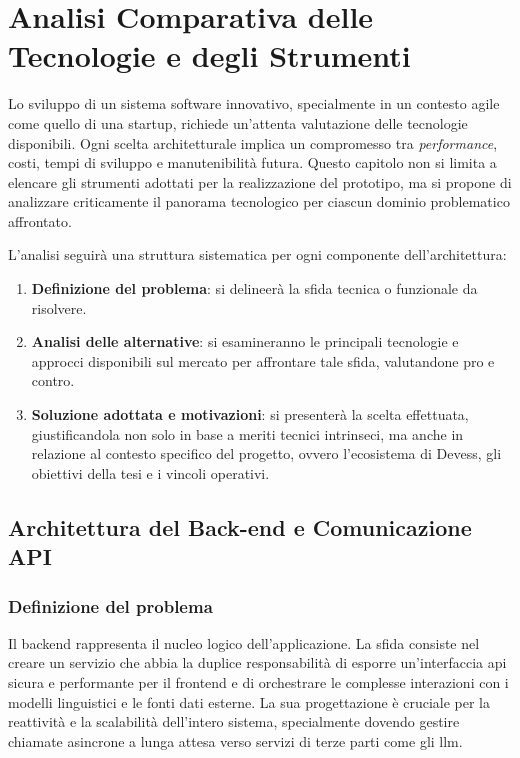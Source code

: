 \chapter{Analisi Comparativa delle Tecnologie e degli Strumenti}
\label{ch:tecnologie_strumenti}

Lo sviluppo di un sistema software innovativo, specialmente in un contesto \gls{agile} come quello di una startup, richiede un'attenta valutazione delle tecnologie disponibili. Ogni scelta architetturale implica un compromesso tra \textit{performance}, costi, tempi di sviluppo e manutenibilità futura. Questo capitolo non si limita a elencare gli strumenti adottati per la realizzazione del prototipo, ma si propone di analizzare criticamente il panorama tecnologico per ciascun dominio problematico affrontato.

L'analisi seguirà una struttura sistematica per ogni componente dell'architettura:
\begin{enumerate}
    \item \textbf{Definizione del problema}: si delineerà la sfida tecnica o funzionale da risolvere.
    \item \textbf{Analisi delle alternative}: si esamineranno le principali tecnologie e approcci disponibili sul mercato per affrontare tale sfida, valutandone pro e contro.
    \item \textbf{Soluzione adottata e motivazioni}: si presenterà la scelta effettuata, giustificandola non solo in base a meriti tecnici intrinseci, ma anche in relazione al contesto specifico del progetto, ovvero l'ecosistema di Devess, gli obiettivi della tesi e i vincoli operativi.
\end{enumerate}

\section{Architettura del Back-end e Comunicazione API}
\label{sec:backend_analysis}

\subsection{Definizione del problema}
Il \gls{backend} rappresenta il nucleo logico dell'applicazione. La sfida consiste nel creare un servizio che abbia la duplice responsabilità di esporre un'interfaccia \gls{api} sicura e performante per il \gls{frontend} e di orchestrare le complesse interazioni con i modelli linguistici e le fonti dati esterne. La sua progettazione è cruciale per la reattività e la scalabilità dell'intero sistema, specialmente dovendo gestire chiamate asincrone a lunga attesa verso servizi di terze parti come gli \gls{llm}.

